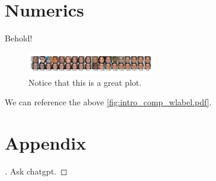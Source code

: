 \documentclass{article}
\begin{document}
\section{Numerics}
\label{loc:body.numerics}
Behold!
\begin{figure}[h]
\centering
\includegraphics[width=0.5\textwidth]{Files/intro_comp_wlabel.pdf}
\caption{Notice that this is a great plot.\label{fig:intro_comp_wlabel.pdf}}
\end{figure}
We can reference the above \autoref{fig:intro_comp_wlabel.pdf}.
\printbibliography
\appendix
\section{Appendix}
\begin{proof}
[\hypertarget{loc:lemma_1.proof}Proof of \autoref{loc:lemma_1.statement}]Ask chatgpt.
\end{proof}
\end{document}
